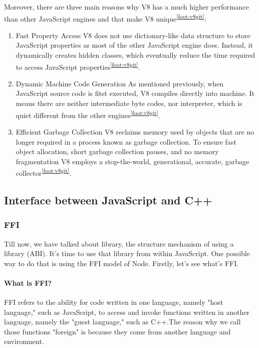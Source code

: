      
    Moreover, there are three main reasons why V8 has a much higher performance than other JavaScript engines and that make V8 unique\textsuperscript{\ref{foot:v8git}}:
        \begin{enumerate}
            \item  Fast Property Access\newline
            V8 does not use dictionary-like data structure to store JavaScript properties as most of the other JavaScript engine does. Instead, it dynamically creates hidden classes, which eventually reduce the time required to access JavaScript properties\textsuperscript{\ref{foot:v8git}}.
            
            \item  Dynamic Machine Code Generation\newline
            As mentioned previously, when JavaScript source code is fitst executed, V8 compiles directly into machine. It means there are neither intermediate byte codes, nor interpreter, which is quiet different from the other engines\textsuperscript{\ref{foot:v8git}}.
            
            \item  Efficient Garbage Collection\newline
            V8 reclaims memory used by objects that are no longer required in a process known as garbage collection. To ensure fast object allocation, short garbage collection pauses, and no memory fragmentation V8 employs a stop-the-world, generational, accurate, garbage collector\textsuperscript{\ref{foot:v8git}}.
        \end{enumerate}



        
    
    \subsection{Interface between JavaScript and C++}
        \subsubsection{FFI}
               
            Till now, we have talked about library, the structure mechanism of using a library (ABI). It's time to use that library from within JavaScript. One possible way to do that is using the FFI model of Node. Firstly, let's see what's FFI.
            
            \paragraph{What is FFI?} FFI refers to the ability for code written in one language, namely "host language," such as JavaScript, to access and invoke functions written in another language, namely the "guest language," such as C++\cite{Sigbjorn-99}.The reason why we call those functions "foreign" is because they come from another language and environment.\cite{Matthias-Grimmer-14}
            
